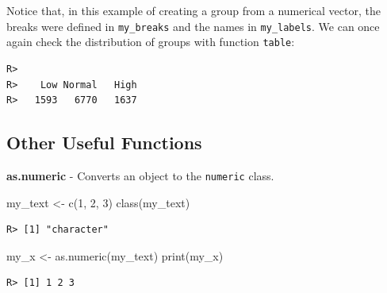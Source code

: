 \documentclass[
  12pt,
]{book}
\newenvironment{Shaded}{\begin{snugshade}}{\end{snugshade}}
\newcommand{\FunctionTok}[1]{\textcolor[rgb]{0,0,0}{#1}}
\newcommand{\NormalTok}[1]{#1}
\newcommand{\OtherTok}[1]{\textcolor[rgb]{0.37,0.37,0.37}{#1}}
\newcommand{\SpecialCharTok}[1]{\textcolor[rgb]{0,0,0}{#1}}
\newcommand{\StringTok}[1]{\textcolor[rgb]{0.5,0.5,0.5}{#1}}
\begin{document}
Notice that, in this example of creating a group from a numerical vector, the breaks were defined in \texttt{my\_breaks} and the names in \texttt{my\_labels}. We can once again check the distribution of groups with function \texttt{table}:

\begin{Shaded}
\end{Shaded}

\begin{verbatim}
R> 
R>    Low Normal   High 
R>   1593   6770   1637
\end{verbatim}

\hypertarget{other-useful-functions-2}{%
\subsection{Other Useful Functions}\label{other-useful-functions-2}}

\textbf{as.numeric} - Converts an object to the \texttt{numeric} class. 

\begin{Shaded}
\begin{Highlighting}[]
\NormalTok{my\_text }\OtherTok{\textless{}{-}} \FunctionTok{c}\NormalTok{(}\StringTok{\textquotesingle{}1\textquotesingle{}}\NormalTok{, }\StringTok{\textquotesingle{}2\textquotesingle{}}\NormalTok{, }\StringTok{\textquotesingle{}3\textquotesingle{}}\NormalTok{)}
\FunctionTok{class}\NormalTok{(my\_text)}
\end{Highlighting}
\end{Shaded}

\begin{verbatim}
R> [1] "character"
\end{verbatim}

\begin{Shaded}
\begin{Highlighting}[]
\NormalTok{my\_x }\OtherTok{\textless{}{-}} \FunctionTok{as.numeric}\NormalTok{(my\_text)}
\FunctionTok{print}\NormalTok{(my\_x)}
\end{Highlighting}
\end{Shaded}

\begin{verbatim}
R> [1] 1 2 3
\end{verbatim}
\end{document}
